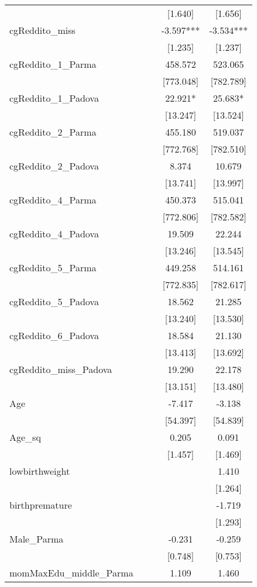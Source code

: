 \documentclass[]{article}
\begin{document}
\begin{tabular}{lcccc}
 &  &  & [1.640] & [1.656] \\
cgReddito\_miss &  &  & -3.597*** & -3.534*** \\
 &  &  & [1.235] & [1.237] \\
cgReddito\_1\_Parma &  &  & 458.572 & 523.065 \\
 &  &  & [773.048] & [782.789] \\
cgReddito\_1\_Padova &  &  & 22.921* & 25.683* \\
 &  &  & [13.247] & [13.524] \\
cgReddito\_2\_Parma &  &  & 455.180 & 519.037 \\
 &  &  & [772.768] & [782.510] \\
cgReddito\_2\_Padova &  &  & 8.374 & 10.679 \\
 &  &  & [13.741] & [13.997] \\
cgReddito\_4\_Parma &  &  & 450.373 & 515.041 \\
 &  &  & [772.806] & [782.582] \\
cgReddito\_4\_Padova &  &  & 19.509 & 22.244 \\
 &  &  & [13.246] & [13.545] \\
cgReddito\_5\_Parma &  &  & 449.258 & 514.161 \\
 &  &  & [772.835] & [782.617] \\
cgReddito\_5\_Padova &  &  & 18.562 & 21.285 \\
 &  &  & [13.240] & [13.530] \\
cgReddito\_6\_Padova &  &  & 18.584 & 21.130 \\
 &  &  & [13.413] & [13.692] \\
cgReddito\_miss\_Padova &  &  & 19.290 & 22.178 \\
 &  &  & [13.151] & [13.480] \\
Age &  &  & -7.417 & -3.138 \\
 &  &  & [54.397] & [54.839] \\
Age\_sq &  &  & 0.205 & 0.091 \\
 &  &  & [1.457] & [1.469] \\
lowbirthweight &  &  &  & 1.410 \\
 &  &  &  & [1.264] \\
birthpremature &  &  &  & -1.719 \\
 &  &  &  & [1.293] \\
Male\_Parma &  &  & -0.231 & -0.259 \\
 &  &  & [0.748] & [0.753] \\
momMaxEdu\_middle\_Parma &  &  & 1.109 & 1.460 \\

\end{tabular}
\end{document}
